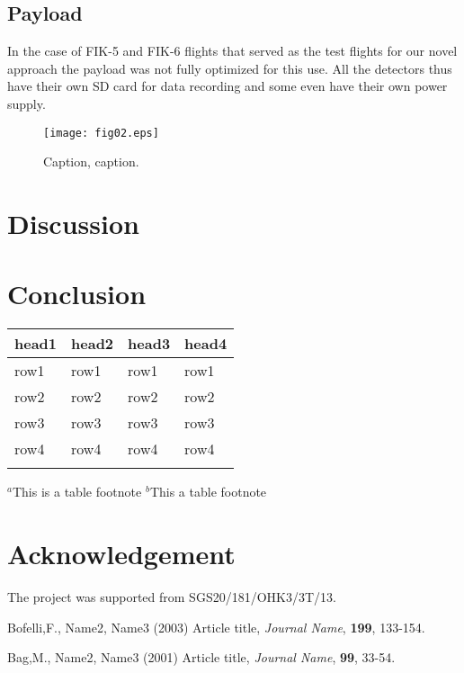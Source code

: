 \documentclass{Rpd}
\begin{document}
\subsection{Payload}
In the case of FIK-5 and FIK-6 flights that served as the test flights for our novel approach the payload was not fully optimized for this use. All the detectors thus have their own SD card for data recording and some even have their own power supply.


%
%


\begin{figure}%
\centerline
\texttt{[image: fig02.eps]}
\caption{Caption, caption.}\label{fig:02}
\end{figure}


\section{Discussion}




\section{Conclusion}




\begin{table}[t]
{\begin{tabular}{llll}\toprule
head1 & head2 & head3 & head4\\\midrule
row1 & row1 & row1 & row1\\
row2 & row2 & row2 & row2\\
row3 & row3 & row3 & row3\\
row4 & row4 & row4 & row4\\\botrule
\end{tabular}}{$^a$This is a table footnote\newline
$^b$This a table footnote}
\end{table}


\section*{Acknowledgement}
The project was supported from  SGS20/181/OHK3/3T/13.



\begin{thebibliography}{99.}%
 Bofelli,F., Name2, Name3 (2003) Article title, {\it Journal Name}, {\bf 199}, 133-154.

 Bag,M., Name2, Name3 (2001) Article title, {\it Journal Name}, {\bf 99}, 33-54.

\end{thebibliography}
\end{document}
